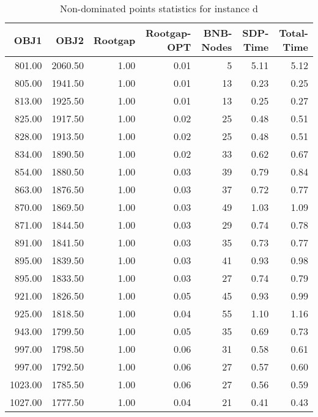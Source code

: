 \begin{table}
\caption{Non-dominated points statistics for instance d}
\label{tab:d}
\begin{tabular}{rrrrrrr}
\toprule
OBJ1 & OBJ2 & Rootgap & Rootgap-OPT & BNB-Nodes & SDP-Time & Total-Time \\
\midrule
801.00 & 2060.50 & 1.00 & 0.01 & 5 & 5.11 & 5.12 \\
805.00 & 1941.50 & 1.00 & 0.01 & 13 & 0.23 & 0.25 \\
813.00 & 1925.50 & 1.00 & 0.01 & 13 & 0.25 & 0.27 \\
825.00 & 1917.50 & 1.00 & 0.02 & 25 & 0.48 & 0.51 \\
828.00 & 1913.50 & 1.00 & 0.02 & 25 & 0.48 & 0.51 \\
834.00 & 1890.50 & 1.00 & 0.02 & 33 & 0.62 & 0.67 \\
854.00 & 1880.50 & 1.00 & 0.03 & 39 & 0.79 & 0.84 \\
863.00 & 1876.50 & 1.00 & 0.03 & 37 & 0.72 & 0.77 \\
870.00 & 1869.50 & 1.00 & 0.03 & 49 & 1.03 & 1.09 \\
871.00 & 1844.50 & 1.00 & 0.03 & 29 & 0.74 & 0.78 \\
891.00 & 1841.50 & 1.00 & 0.03 & 35 & 0.73 & 0.77 \\
895.00 & 1839.50 & 1.00 & 0.03 & 41 & 0.93 & 0.98 \\
895.00 & 1833.50 & 1.00 & 0.03 & 27 & 0.74 & 0.79 \\
921.00 & 1826.50 & 1.00 & 0.05 & 45 & 0.93 & 0.99 \\
925.00 & 1818.50 & 1.00 & 0.04 & 55 & 1.10 & 1.16 \\
943.00 & 1799.50 & 1.00 & 0.05 & 35 & 0.69 & 0.73 \\
997.00 & 1798.50 & 1.00 & 0.06 & 31 & 0.58 & 0.61 \\
997.00 & 1792.50 & 1.00 & 0.06 & 27 & 0.57 & 0.60 \\
1023.00 & 1785.50 & 1.00 & 0.06 & 27 & 0.56 & 0.59 \\
1027.00 & 1777.50 & 1.00 & 0.04 & 21 & 0.41 & 0.43 \\
\bottomrule
\end{tabular}
\end{table}
